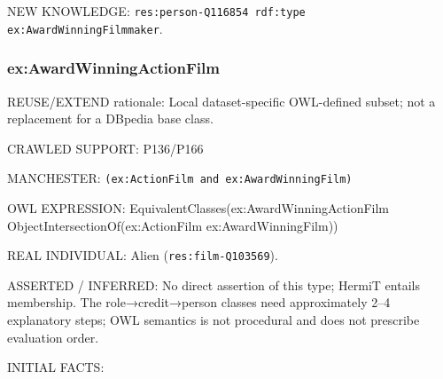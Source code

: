 \documentclass[
  11pt,
]{article}
\begin{document}
NEW KNOWLEDGE:
\texttt{res:\allowbreak{}pers\allowbreak{}on-\allowbreak{}\allowbreak{}Q1168\allowbreak{}54 rdf:\allowbreak{}t\allowbreak{}ype ex:\allowbreak{}\allowbreak{}A\allowbreak{}ward\allowbreak{}Winn\allowbreak{}ing\allowbreak{}Filmm\allowbreak{}aker}.

\subsubsection{\texorpdfstring{ex:\allowbreak{}\allowbreak{}Award\allowbreak{}\allowbreak{}Winning\allowbreak{}A\allowbreak{}ction\allowbreak{}Fil\allowbreak{}m}{}}\label{exawardwinningactionfilm}

REUSE/EXTEND rationale: Local dataset-\allowbreak{}specific\allowbreak{}
OWL-defined subset; not a replacement for a DBpedia base class.

CRAWLED SUPPORT: P136/P166

MANCHESTER:
\texttt{(ex:\allowbreak{}\allowbreak{}Acti\allowbreak{}on\allowbreak{}Film a\allowbreak{}nd ex:\allowbreak{}\allowbreak{}Aw\allowbreak{}ard\allowbreak{}Winni\allowbreak{}ng\allowbreak{}Film)}

OWL EXPRESSION:
Equivale\allowbreak{}nt\allowbreak{}Classe\allowbreak{}s(ex:\allowbreak{}\allowbreak{}Awa\allowbreak{}rd\allowbreak{}Winnin\allowbreak{}g\allowbreak{}Action\allowbreak{}F\allowbreak{}ilm
Object\allowbreak{}In\allowbreak{}tersecti\allowbreak{}on\allowbreak{}Of(ex:\allowbreak{}\allowbreak{}Action\allowbreak{}Fi\allowbreak{}lm
ex:\allowbreak{}\allowbreak{}Award\allowbreak{}\allowbreak{}Winning\allowbreak{}F\allowbreak{}ilm))

REAL INDIVIDUAL: Alien
(\texttt{res:\allowbreak{}film\allowbreak{}-\allowbreak{}\allowbreak{}Q103569\allowbreak{}}).

ASSERTED / INFERRED: No direct assertion of this type; HermiT entails
membership. The role→credit→person classes need
approxim\allowbreak{}ately 2--4 explanatory steps; OWL semantics is not
procedural and does not prescribe evaluation order.

INITIAL FACTS:
\end{document}

